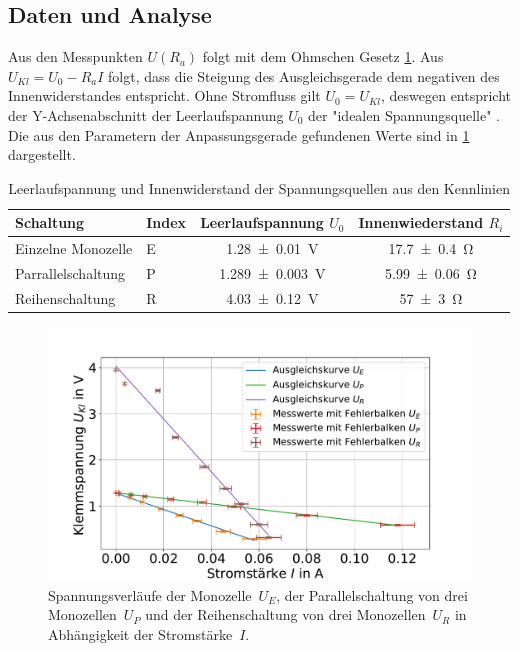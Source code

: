 \subsection{Daten und Analyse}


Aus den Messpunkten $U(R_a)$ folgt mit dem Ohmschen Gesetz \cref{fig:batt-ges-u}. Aus $U_{Kl}=U_0-R_a I$ folgt, dass die Steigung des Ausgleichsgerade dem negativen des Innenwiderstandes entspricht. Ohne Stromfluss gilt $U_0=U_{Kl}$, deswegen entspricht der Y-Achsenabschnitt der Leerlaufspannung $U_0$ der "idealen Spannungsquelle" \cite{lw}. Die aus den Parametern der Anpassungsgerade gefundenen Werte sind in \cref{tab:batt-U-R} dargestellt.





\begin{table}
	\caption{Leerlaufspannung und Innenwiderstand der Spannungsquellen aus den Kennlinien}
	\centering
	\begin{tabular}{|l l||c|c|}
		\hline 
		Schaltung & Index	& Leerlaufspannung $U_0$ & Innenwiederstand $R_i$ \\ 
		\hline \hline
		Einzelne Monozelle	&E& \SI{1.28+-0.01}{V}  & \SI{17.7+-0.4}{\ohm } \\ 
		\hline  
		Parrallelschaltung	&P& \SI{1.289+-0.003}{V } &\SI{5.99+-0.06}{\ohm }  \\ 
		\hline   
		Reihenschaltung	&R& \SI{4.03+-0.12}{V } &\SI{57+-3}{\ohm }  \\ 
		\hline 
	\end{tabular} 
	
	\label{tab:batt-U-R}
	
\end{table}


 


\begin{figure}[h]
	\centering
	\includegraphics[width=0.9\linewidth]{"auswertung/Auswertung Innenwiderstand/Batterie Gesamt U"}
	\caption{Spannungsverläufe der Monozelle~$U_E$, der Parallelschaltung von drei Monozellen~$U_P$ und der Reihenschaltung von drei Monozellen~$U_R$ in Abhängigkeit der Stromstärke~$I$.}
	\label{fig:batt-ges-u}
\end{figure}










